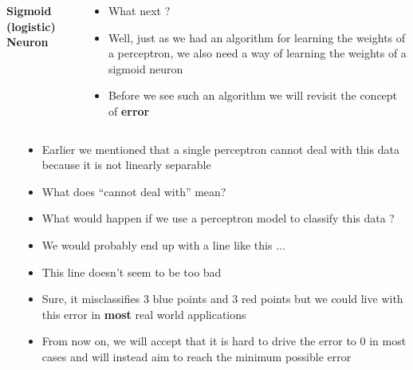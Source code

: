 \begin{frame}
\end{frame}
\begin{frame}
	\begin{columns}
		\begin{overlayarea}{\textwidth}{\textheight}
			\vspace{+0.2in}
			\begin{center}
				\textbf{Sigmoid (logistic) Neuron}
				
			\end{center}
		\end{overlayarea}
		\begin{overlayarea}{\textwidth}{\textheight}
			\begin{itemize}\justifying
				\item<1-> What next ?
				\item<2-> Well, just as we had an algorithm for learning the weights of a perceptron, we also need a way of learning the weights of a sigmoid neuron
				\item<3-> Before we see such an algorithm we will revisit the concept of \textbf{error}
			\end{itemize}
		\end{overlayarea}
	\end{columns}
\end{frame}


\begin{frame}
	\begin{columns}
		\column{0.3\textwidth}
		\begin{overlayarea}{\textwidth}{\textheight}
			
		\end{overlayarea}
		\column{0.7\textwidth}
		\begin{overlayarea}{\textwidth}{\textheight}
			\begin{itemize}\justifying
				\item<1-> Earlier we mentioned that a single perceptron cannot deal with this data because it is not linearly separable
				\item<2-> What does ``cannot deal with'' mean?
				\item<3-> What would happen if we use a perceptron model to classify this data ?
				\item<4-> We would probably end up with a line like this ...
				\item<5-> This line doesn't seem to be too bad
				\item<6-> Sure, it misclassifies 3 blue points and 3 red points but we could live with this error in \textbf{most} real world applications
				\item<7-> From now on, we will accept that it is hard to drive the error to 0 in most cases and will instead aim to reach the minimum possible error
			\end{itemize}
		\end{overlayarea}
	\end{columns}
\end{frame}


